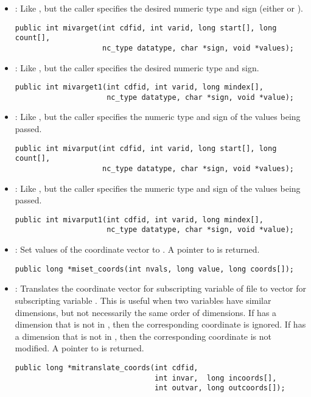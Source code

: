 \begin{itemize}
\item {} : Like , but the caller specifies
the desired numeric type and sign (either  or
).
\begin{verbatim}
public int mivarget(int cdfid, int varid, long start[], long count[],
                    nc_type datatype, char *sign, void *values);
\end{verbatim}

\item {} : Like , but the caller
specifies the desired numeric type and sign.
\begin{verbatim}
public int mivarget1(int cdfid, int varid, long mindex[],
                     nc_type datatype, char *sign, void *value);
\end{verbatim}

\item {} : Like , but the caller specifies
the numeric type and sign of the values being passed.
\begin{verbatim}
public int mivarput(int cdfid, int varid, long start[], long count[],
                    nc_type datatype, char *sign, void *values);
\end{verbatim}

\item {} : Like , but the caller specifies
the numeric type and sign of the values being passed.
\begin{verbatim}
public int mivarput1(int cdfid, int varid, long mindex[],
                     nc_type datatype, char *sign, void *value);
\end{verbatim}

\item {} : Set  values of the coordinate
vector  to . A pointer to  is
returned.
\begin{verbatim}
public long *miset_coords(int nvals, long value, long coords[]);
\end{verbatim}

\item {} : Translates the coordinate vector
 for subscripting variable  of file
 to vector  for subscripting variable
. This is useful when two variables have similar
dimensions, but not necessarily the same order of dimensions. If
 has a dimension that is not in , then the
corresponding coordinate is ignored. If  has a dimension
that is not in , then the corresponding coordinate is not
modified. A pointer to  is returned.
\begin{verbatim}
public long *mitranslate_coords(int cdfid, 
                                int invar,  long incoords[],
                                int outvar, long outcoords[]);
\end{verbatim}


\end{itemize}

